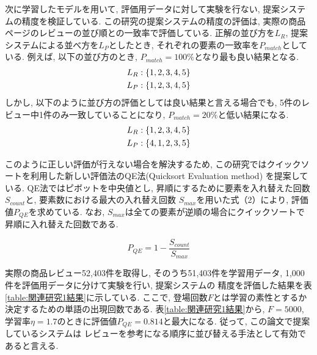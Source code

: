 \documentclass{ltjarticle}
\begin{document}
次に学習したモデルを用いて, 評価用データに対して実験を行ない, 提案システムの精度を検証している. 
この研究の提案システムの精度の評価は, 実際の商品ページのレビューの並び順との一致率で評価している. 
正解の並び方を$L_R$, 提案システムによる並べ方を$L_P$としたとき, それぞれの要素の一致率を$P_{match}$としている. 
例えば, 以下の並び方のとき, $P_{match}=100\%$となり最も良い結果となる. 
\begin{align}
    L_R:\{1,2,3,4,5\}\notag\\
    L_P:\{1,2,3,4,5\}\notag
\end{align}
しかし, 以下のように並び方の評価としては良い結果と言える場合でも, 5件のレビュー中1件のみ一致していることになり, 
$P_{match}=20\%$と低い結果になる. 
\begin{align}
    L_R:\{1,2,3,4,5\}\notag\\
    L_P:\{4,1,2,3,5\}\notag
\end{align}

このように正しい評価が行えない場合を解決するため, この研究ではクイックソートを利用した新しい評価法のQE法(Quicksort Evaluation method)
を提案している. QE法ではピボットを中央値とし, 昇順にするために要素を入れ替えた回数$S_{count}$と, 要素数における最大の入れ替え回数
$S_{max}$を用いた式（2）により, 評価値$P_{QE}$を求めている. なお, $S_{max}$は全ての要素が逆順の場合にクイックソートで
昇順に入れ替えた回数である. 
\vspace{5truept}

\begin{equation}
    P_{QE}=1-\dfrac{S_{count}}{S_{max}}
\end{equation}
\vspace{5truept}

実際の商品レビュー52,403件を取得し, そのうち51,403件を学習用データ, 1,000件を評価用データに分けて実験を行い, 提案システムの
精度を評価した結果を表\ref{table:関連研究1結果}に示している. 
ここで, 登場回数$F$とは学習の素性とするか決定するための単語の出現回数である. 
表\ref{table:関連研究1結果}から, $F=5000$, 学習率$\eta=1.7$のときに評価値$P_{QE}=0.814$と最大になる. 従って, この論文で提案しているシステムは
レビューを参考になる順序に並び替える手法として有効であると言える. 
\end{document}
